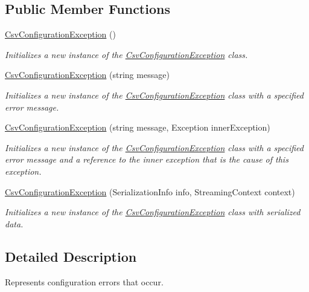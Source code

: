 \subsection*{Public Member Functions}
\begin{DoxyCompactItemize}
\item 
\hyperlink{a00042_a26b35b967f6c7e409dd84bdb60619993}{Csv\-Configuration\-Exception} ()
\begin{DoxyCompactList}\small\item\em Initializes a new instance of the \hyperlink{a00042}{Csv\-Configuration\-Exception} class. \end{DoxyCompactList}\item 
\hyperlink{a00042_a77c920cd1ce043a9494cd19cb074f84e}{Csv\-Configuration\-Exception} (string message)
\begin{DoxyCompactList}\small\item\em Initializes a new instance of the \hyperlink{a00042}{Csv\-Configuration\-Exception} class with a specified error message. \end{DoxyCompactList}\item 
\hyperlink{a00042_a2dee1f8508b1411b8dc4d369abfd04aa}{Csv\-Configuration\-Exception} (string message, Exception inner\-Exception)
\begin{DoxyCompactList}\small\item\em Initializes a new instance of the \hyperlink{a00042}{Csv\-Configuration\-Exception} class with a specified error message and a reference to the inner exception that is the cause of this exception. \end{DoxyCompactList}\item 
\hyperlink{a00042_af53550f7b533e7878e010c4048e6686c}{Csv\-Configuration\-Exception} (Serialization\-Info info, Streaming\-Context context)
\begin{DoxyCompactList}\small\item\em Initializes a new instance of the \hyperlink{a00042}{Csv\-Configuration\-Exception} class with serialized data. \end{DoxyCompactList}\end{DoxyCompactItemize}


\subsection{Detailed Description}
Represents configuration errors that occur. 



